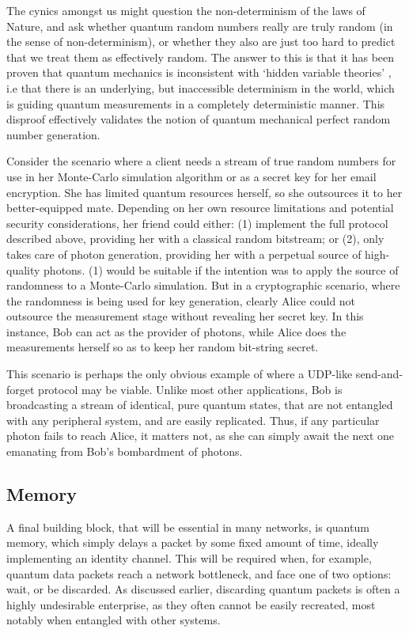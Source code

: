 \documentclass[aps,rmp,twocolumn,amsmath,amssymb,nofootinbib,superscriptaddress,longbibliography,floatfix]{revtex4-1}
\begin{document}
The cynics amongst us might question the non-determinism of the laws of Nature, and ask whether quantum random numbers really are truly random (in the sense of non-determinism), or whether they also are just too hard to predict that we treat them as effectively random. The answer to this is that it has been proven that quantum mechanics is inconsistent with `hidden variable theories' \cite{Bell}, i.e that there is an underlying, but inaccessible determinism in the world, which is guiding quantum measurements in a completely deterministic manner. This disproof effectively validates the notion of quantum mechanical perfect random number generation.

Consider the scenario where a client needs a stream of true random numbers for use in her Monte-Carlo simulation algorithm or as a secret key for her email encryption. She has limited quantum resources herself, so she outsources it to her better-equipped mate. Depending on her own resource limitations and potential security considerations, her friend could either: (1) implement the full protocol described above, providing her with a classical random bitstream; or (2), only takes care of photon generation, providing her with a perpetual source of high-quality photons. (1) would be suitable if the intention was to apply the source of randomness to a Monte-Carlo simulation. But in a cryptographic scenario, where the randomness is being used for key generation, clearly Alice could not outsource the measurement stage without revealing her secret key. In this instance, Bob can act as the provider of photons, while Alice does the measurements herself so as to keep her random bit-string secret.

This scenario is perhaps the only obvious example of where a UDP-like send-and-forget protocol may be viable. Unlike most other applications, Bob is broadcasting a stream of identical, pure quantum states, that are not entangled with any peripheral system, and are easily replicated. Thus, if any particular photon fails to reach Alice, it matters not, as she can simply await the next one emanating from Bob's bombardment of photons.

%
%

\subsection{Memory} \label{sec:memory}

A final building block, that will be essential in many networks, is quantum memory, which simply delays a packet by some fixed amount of time, ideally implementing an identity channel. This will be required when, for example, quantum data packets reach a network bottleneck, and face one of two options: wait, or be discarded. As discussed earlier, discarding quantum packets is often a highly undesirable enterprise, as they often cannot be easily recreated, most notably when entangled with other systems.
\end{document}
